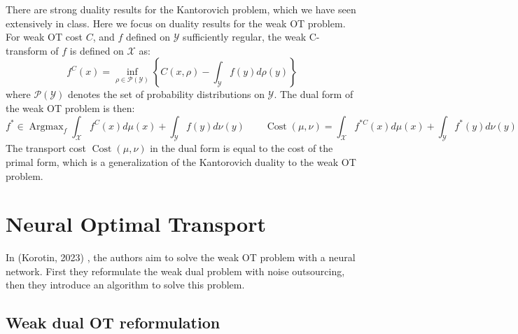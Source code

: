 \documentclass[11pt]{article}
\DeclareMathOperator*{\Argmax}{\text{Argmax}}
\DeclareMathOperator*{\Cost}{\text{Cost}}
\begin{document}
There are strong duality results for the Kantorovich problem, which we have seen extensively in class. Here we focus on duality results for the weak OT problem. For weak OT cost $C$, and $f$ defined on $\mathcal{Y}$ sufficiently regular, the weak C-transform of $f$ is defined on $\mathcal{X}$ as:
\begin{equation}
    f^C(x) = \inf_{\rho\in \mathcal{P}(\mathcal{Y})} \left\{C(x,\rho)-\int_{\mathcal{Y}}f(y)d\rho(y)\right\}
\end{equation}
where $\mathcal{P}(\mathcal{Y})$ denotes the set of probability distributions on $\mathcal{Y}$. The dual form of the weak OT problem is then:
\begin{equation}
    f^*\in\Argmax_{f} \int_{\mathcal{X}} f^C(x)d\mu(x) + \int_{\mathcal{Y}} f(y)d\nu(y) \quad\quad \Cost(\mu,\nu) = \int_{\mathcal{X}} f^{*C}(x)d\mu(x) + \int_{\mathcal{Y}} f^*(y)d\nu(y)
\end{equation}
The transport cost $\Cost(\mu,\nu)$ in the dual form is equal to the cost of the primal form, which is a generalization of the Kantorovich duality to the weak OT problem.

\section{Neural Optimal Transport}

In (Korotin, 2023) \cite{korotin-2022}, the authors aim to solve the weak OT problem with a neural network. First they reformulate the weak dual problem with noise outsourcing, then they introduce an algorithm to solve this problem.

\subsection{Weak dual OT reformulation}
\end{document}
